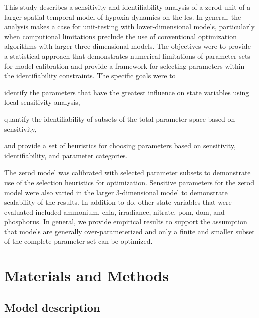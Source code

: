 \documentclass[review]{elsarticle}\usepackage[]{graphicx}\usepackage[]{color}
\begin{document}
This study describes a sensitivity and identifiability analysis of a \ac{zerod} unit of a larger spatial-temporal model of hypoxia dynamics on the \ac{lcs}. In general, the analysis makes a case for unit-testing with lower-dimensional models, particularly when computional limitations preclude the use of conventional optimization algorithms with larger three-dimensional models. The objectives were to provide a statistical approach that demonstrates numerical limitations of parameter sets for model calibration and provide a framework for selecting parameters within the identifiability constraints.  The specific goals were to \begin{inparaenum}[1\upshape)]
\item identify the parameters that have the greatest influence on state variables using local sensitivity analysis,
\item quantify the identifiability of subsets of the total parameter space based on sensitivity,
\item and provide a set of heuristics for choosing parameters based on sensitivity, identifiability, and parameter categories.
\end{inparaenum}
The \ac{zerod} model was calibrated with selected parameter subsets to demonstrate use of the selection heuristics for optimization.  Sensitive parameters for the \ac{zerod} model were also varied in the larger 3-dimensional model to demonstrate scalability of the results. In addition to \ac{do}, other state variables that were evaluated included ammonium, \ac{chla}, irradiance, nitrate, \ac{pom}, \ac{dom}, and phosphorus. In general, we provide empirical results to support the assumption that models are generally over-parameterized and only a finite and smaller subset of the complete parameter set can be optimized.

\section{Materials and Methods}

\subsection{Model description}
\end{document}
